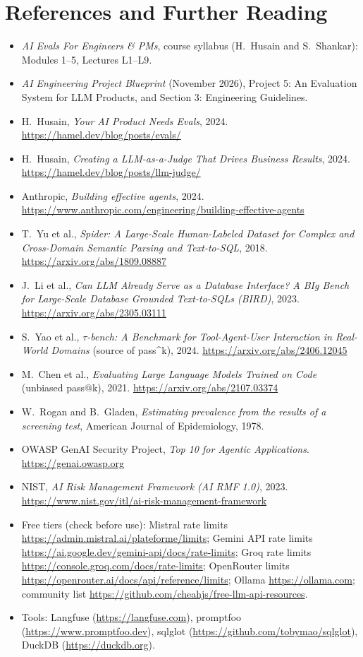 \documentclass[11pt,a4paper]{article}
\begin{document}
\section{References and Further Reading}

\begin{itemize}
\item \emph{AI Evals For Engineers \& PMs}, course syllabus (H.~Husain and S.~Shankar):
Modules 1--5, Lectures L1--L9.
\item \emph{AI Engineering Project Blueprint} (November 2026), Project 5: An Evaluation System for
LLM Products, and Section 3: Engineering Guidelines.
\item H.~Husain, \emph{Your AI Product Needs Evals}, 2024. \url{https://hamel.dev/blog/posts/evals/}
\item H.~Husain, \emph{Creating a LLM-as-a-Judge That Drives Business Results}, 2024.
\url{https://hamel.dev/blog/posts/llm-judge/}
\item Anthropic, \emph{Building effective agents}, 2024.
\url{https://www.anthropic.com/engineering/building-effective-agents}
\item T.~Yu et al., \emph{Spider: A Large-Scale Human-Labeled Dataset for Complex and Cross-Domain
Semantic Parsing and Text-to-SQL}, 2018. \url{https://arxiv.org/abs/1809.08887}
\item J.~Li et al., \emph{Can LLM Already Serve as a Database Interface? A BIg Bench for Large-Scale
Database Grounded Text-to-SQLs (BIRD)}, 2023. \url{https://arxiv.org/abs/2305.03111}
\item S.~Yao et al., \emph{$\tau$-bench: A Benchmark for Tool-Agent-User Interaction in Real-World
Domains} (source of pass\^{}k), 2024. \url{https://arxiv.org/abs/2406.12045}
\item M.~Chen et al., \emph{Evaluating Large Language Models Trained on Code} (unbiased pass@k),
2021. \url{https://arxiv.org/abs/2107.03374}
\item W.~Rogan and B.~Gladen, \emph{Estimating prevalence from the results of a screening test},
American Journal of Epidemiology, 1978.
\item OWASP GenAI Security Project, \emph{Top 10 for Agentic Applications}. \url{https://genai.owasp.org}
\item NIST, \emph{AI Risk Management Framework (AI RMF 1.0)}, 2023. \url{https://www.nist.gov/itl/ai-risk-management-framework}
\item Free tiers (check before use): Mistral rate limits \url{https://admin.mistral.ai/plateforme/limits};
Gemini API rate limits \url{https://ai.google.dev/gemini-api/docs/rate-limits}; Groq rate limits
\url{https://console.groq.com/docs/rate-limits}; OpenRouter limits \url{https://openrouter.ai/docs/api/reference/limits};
Ollama \url{https://ollama.com}; community list \url{https://github.com/cheahjs/free-llm-api-resources}.
\item Tools: Langfuse (\url{https://langfuse.com}), promptfoo (\url{https://www.promptfoo.dev}),
sqlglot (\url{https://github.com/tobymao/sqlglot}), DuckDB (\url{https://duckdb.org}).
\end{itemize}
\end{document}
